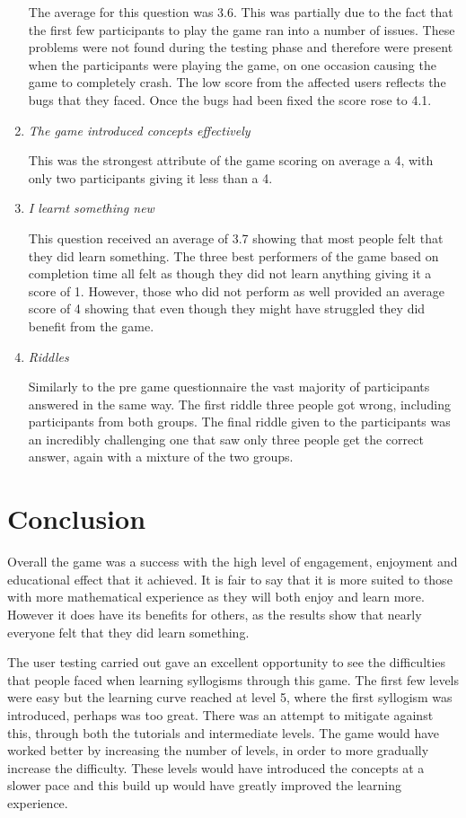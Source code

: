 \documentclass[12pt,a4paper]{report}
\begin{document}
\begin{enumerate}
	The average for this question was 3.6. This was partially due to the fact that the first few participants to play the game ran into a number of issues. These problems were not found during the testing phase and therefore were present when the participants were playing the game, on one occasion causing the game to completely crash. The low score from the affected users reflects the bugs that they faced. Once the bugs had been fixed the score rose to 4.1.
	
	\item  \textit {The game introduced concepts effectively}
	
	This was the strongest attribute of the game scoring on average a 4, with only two participants giving it less than a 4.
	
	\item  \textit {I learnt something new}
	
	This question received an average of 3.7 showing that most people felt that they did learn something. The three best performers of the game based on completion time all felt as though they did not learn anything giving it a score of 1. However, those who did not perform as well provided an average score of 4 showing that even though they might have struggled they did benefit from the game.
	
	\item  \textit {Riddles}
	
	Similarly to the pre game questionnaire the vast majority of participants answered in the same way. The first riddle three people got wrong, including participants from both groups. The final riddle given to the participants was an incredibly challenging one that saw only three people get the correct answer, again with a mixture of the two groups. 
	
\end{enumerate}

\chapter{Conclusion}

Overall the game was a success with the high level of engagement, enjoyment and educational effect that it achieved. It is fair to say that it is more suited to those with more mathematical experience as they will both enjoy and learn more. However it does have its benefits for others, as the results show that nearly everyone felt that they did learn something. 

The user testing carried out gave an excellent opportunity to see the difficulties that people faced when learning syllogisms through this game. The first few levels were easy but the learning curve reached at level 5, where the first syllogism was introduced, perhaps was too great. There was an attempt to mitigate against this, through both the tutorials and intermediate levels. The game would have worked better by increasing the number of levels, in order to more gradually increase the difficulty. These levels would have introduced the concepts at a slower pace and this build up would have greatly improved the learning experience.
\end{document}
